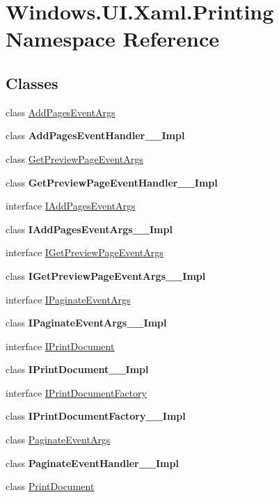 \hypertarget{namespace_windows_1_1_u_i_1_1_xaml_1_1_printing}{}\section{Windows.\+U\+I.\+Xaml.\+Printing Namespace Reference}
\label{namespace_windows_1_1_u_i_1_1_xaml_1_1_printing}
\subsection*{Classes}
\begin{DoxyCompactItemize}
\item 
class \hyperlink{class_windows_1_1_u_i_1_1_xaml_1_1_printing_1_1_add_pages_event_args}{Add\+Pages\+Event\+Args}
\item 
class {\bfseries Add\+Pages\+Event\+Handler\+\_\+\+\_\+\+Impl}
\item 
class \hyperlink{class_windows_1_1_u_i_1_1_xaml_1_1_printing_1_1_get_preview_page_event_args}{Get\+Preview\+Page\+Event\+Args}
\item 
class {\bfseries Get\+Preview\+Page\+Event\+Handler\+\_\+\+\_\+\+Impl}
\item 
interface \hyperlink{interface_windows_1_1_u_i_1_1_xaml_1_1_printing_1_1_i_add_pages_event_args}{I\+Add\+Pages\+Event\+Args}
\item 
class {\bfseries I\+Add\+Pages\+Event\+Args\+\_\+\+\_\+\+Impl}
\item 
interface \hyperlink{interface_windows_1_1_u_i_1_1_xaml_1_1_printing_1_1_i_get_preview_page_event_args}{I\+Get\+Preview\+Page\+Event\+Args}
\item 
class {\bfseries I\+Get\+Preview\+Page\+Event\+Args\+\_\+\+\_\+\+Impl}
\item 
interface \hyperlink{interface_windows_1_1_u_i_1_1_xaml_1_1_printing_1_1_i_paginate_event_args}{I\+Paginate\+Event\+Args}
\item 
class {\bfseries I\+Paginate\+Event\+Args\+\_\+\+\_\+\+Impl}
\item 
interface \hyperlink{interface_windows_1_1_u_i_1_1_xaml_1_1_printing_1_1_i_print_document}{I\+Print\+Document}
\item 
class {\bfseries I\+Print\+Document\+\_\+\+\_\+\+Impl}
\item 
interface \hyperlink{interface_windows_1_1_u_i_1_1_xaml_1_1_printing_1_1_i_print_document_factory}{I\+Print\+Document\+Factory}
\item 
class {\bfseries I\+Print\+Document\+Factory\+\_\+\+\_\+\+Impl}
\item 
class \hyperlink{class_windows_1_1_u_i_1_1_xaml_1_1_printing_1_1_paginate_event_args}{Paginate\+Event\+Args}
\item 
class {\bfseries Paginate\+Event\+Handler\+\_\+\+\_\+\+Impl}
\item 
class \hyperlink{class_windows_1_1_u_i_1_1_xaml_1_1_printing_1_1_print_document}{Print\+Document}
\end{DoxyCompactItemize}
